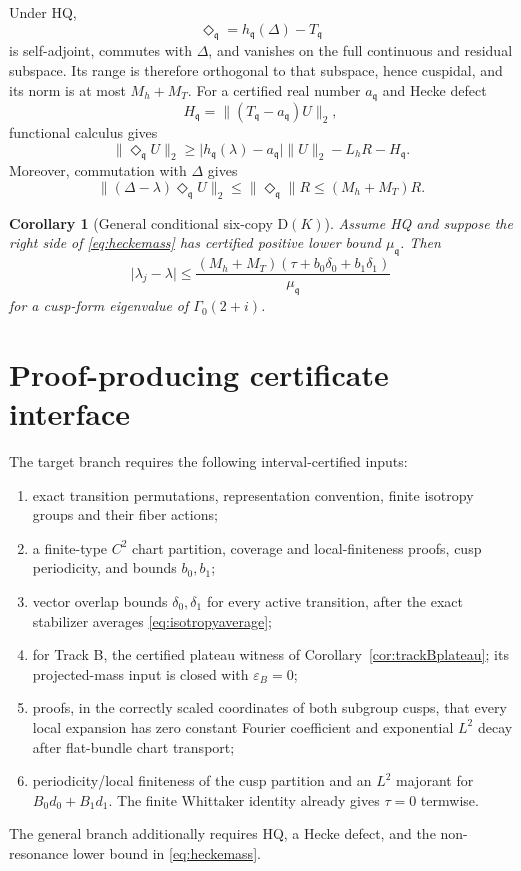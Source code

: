 \documentclass[11pt]{amsart}
\newtheorem{corollary}[theorem]{Corollary}
\theoremstyle{definition}
\newcommand{\Hsub}{\Gamma_0(2+i)}
\newcommand{\norm}[1]{\lVert #1\rVert}
\newcommand{\abs}[1]{\lvert #1\rvert}
\newcommand{\D}{\Delta}
\begin{document}
Under HQ,
\[
 \Diamond_{\mathfrak q}=h_{\mathfrak q}(\D)-T_{\mathfrak q}
\]
is self-adjoint, commutes with $\D$, and vanishes
on the full continuous and residual subspace. Its range is therefore
orthogonal to that subspace, hence cuspidal, and its norm is at most
$M_h+M_T$. For a certified real number
$a_{\mathfrak q}$ and Hecke defect
\[
 H_{\mathfrak q}=\norm{(T_{\mathfrak q}-a_{\mathfrak q})U}_2,
\]
functional calculus gives
\begin{equation}\label{eq:heckemass}
 \norm{\Diamond_{\mathfrak q}U}_2
 \ge
 \abs{h_{\mathfrak q}(\lambda)-a_{\mathfrak q}}\norm{U}_2
 -L_hR-H_{\mathfrak q}.
\end{equation}
Moreover, commutation with $\D$ gives
\[
 \norm{(\D-\lambda)\Diamond_{\mathfrak q}U}_2
 \le \norm{\Diamond_{\mathfrak q}}R
 \le (M_h+M_T)R.
\]

\begin{corollary}[General conditional six-copy D$(K)$]\label{cor:general}
Assume HQ and suppose the right side of \eqref{eq:heckemass} has certified
positive lower bound $\mu_{\mathfrak q}$. Then
\[
 \abs{\lambda_j-\lambda}
 \le
 \frac{(M_h+M_T)(\tau+b_0\delta_0+b_1\delta_1)}
 {\mu_{\mathfrak q}}
\]
for a cusp-form eigenvalue of $\Hsub$.
\end{corollary}

\section{Proof-producing certificate interface}

The target branch requires the following interval-certified inputs:
\begin{enumerate}[leftmargin=*]
\item exact transition permutations, representation convention, finite
isotropy groups and their fiber actions;
\item a finite-type $C^2$ chart partition, coverage and local-finiteness
proofs, cusp periodicity, and bounds $b_0,b_1$;
\item vector overlap bounds $\delta_0,\delta_1$ for every active transition,
after the exact stabilizer averages \eqref{eq:isotropyaverage};
\item for Track B, the certified plateau witness of
Corollary~\ref{cor:trackBplateau}; its projected-mass input is closed with
$\varepsilon_B=0$;
\item proofs, in the correctly scaled coordinates of both subgroup cusps,
that every local expansion has zero constant Fourier coefficient and
exponential $L^2$ decay after flat-bundle chart transport;
\item periodicity/local finiteness of the cusp partition and an $L^2$
majorant for $B_0d_0+B_1d_1$. The finite Whittaker identity already gives
$\tau=0$ termwise.
\end{enumerate}
The general branch additionally requires HQ, a Hecke defect, and the
non-resonance lower bound in \eqref{eq:heckemass}.
\end{document}
